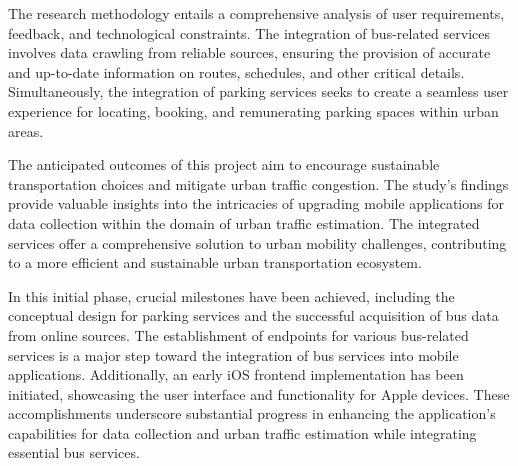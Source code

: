 \documentclass[13pt, a4paper]{article}
\begin{document}
The research methodology entails a comprehensive analysis of user requirements, feedback, and technological constraints. The integration of bus-related services involves data crawling from reliable sources, ensuring the provision of accurate and up-to-date information on routes, schedules, and other critical details. Simultaneously, the integration of parking services seeks to create a seamless user experience for locating, booking, and remunerating parking spaces within urban areas.

The anticipated outcomes of this project aim to encourage sustainable transportation choices and mitigate urban traffic congestion. The study's findings provide valuable insights into the intricacies of upgrading mobile applications for data collection within the domain of urban traffic estimation. The integrated services offer a comprehensive solution to urban mobility challenges, contributing to a more efficient and sustainable urban transportation ecosystem.

In this initial phase, crucial milestones have been achieved, including the conceptual design for parking services and the successful acquisition of bus data from online sources. The establishment of endpoints for various bus-related services is a major step toward the integration of bus services into mobile applications. Additionally, an early iOS frontend implementation has been initiated, showcasing the user interface and functionality for Apple devices. These accomplishments underscore substantial progress in enhancing the application's capabilities for data collection and urban traffic estimation while integrating essential bus services.


\newpage
\tableofcontents
\newpage
\listoffigures
\listoftables








\nocite{*}
\printbibliography[heading=bibintoc, title={REFERENCE}]
\end{document}
